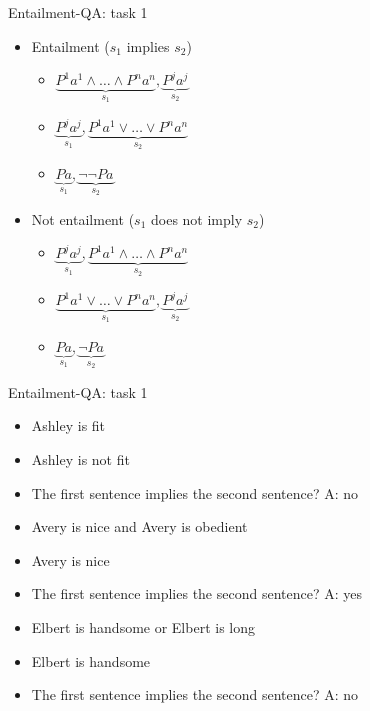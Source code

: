 \documentclass[10pt]{beamer}
\begin{document}
\begin{frame}{Entailment-QA: task 1}
\begin{itemize}
\item \alert{Entailment} ($s_1$ implies $s_2$)
\begin{itemize}
\item $\underbrace{P^{1}a^1 \land \dots \land P^{n}a^n}_{s_1}, \underbrace{P^{j}a^j}_{s_2}$ 
\item $\underbrace{P^{j}a^j}_{s_1}, \underbrace{P^{1}a^1 \lor \dots \lor P^{n}a^n}_{s_2}$
\item $\underbrace{Pa}_{s_1}, \underbrace{\lnot \lnot Pa}_{s_2}$
\end{itemize}

\vspace{0.4cm}
\item \alert{Not entailment} ($s_1$ does not imply $s_2$)
\begin{itemize}
\item $\underbrace{P^{j}a^j}_{s_1}, \underbrace{P^{1}a^1 \land \dots \land P^{n}a^n}_{s_2}$ 
\item $\underbrace{P^{1}a^1 \lor \dots \lor P^{n}a^n}_{s_1}, \underbrace{P^{j}a^j}_{s_2}$
\item $\underbrace{Pa}_{s_1}, \underbrace{\lnot Pa}_{s_2}$
\end{itemize}
\end{itemize}
\end{frame}


\begin{frame}{Entailment-QA: task 1}
\begin{itemize} 
\item[] Ashley is fit
\item[] Ashley is not fit
\item[] The first sentence implies the second sentence? \alert{A: no}
\end{itemize}

\vspace{0.3cm}


\begin{itemize} 
\item[]Avery is nice and Avery is obedient
\item[]Avery is nice
\item[]The first sentence implies the second sentence? \alert{A: yes}
\end{itemize}

\vspace{0.3cm}

\begin{itemize} 
\item[]Elbert is handsome or Elbert is long
\item[]Elbert is handsome
\item[]The first sentence implies the second sentence? \alert{A: no}
\end{itemize}
\end{frame}
\end{document}
